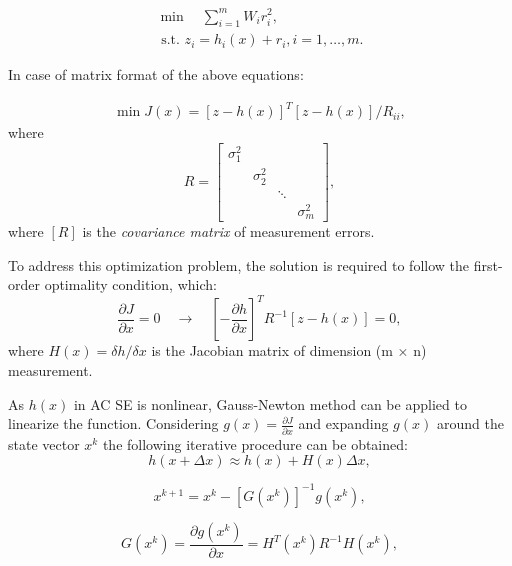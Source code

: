 \begin{equation}
    \begin{array}{c}
    \operatorname{min} \quad \sum_{i=1}^{m} W_{i} r_{i}^{2}, \\
    \text { s.t. } z_{i}=h_{i}(x)+r_{i}, i=1, \ldots, m.
\end{array}
\label{eq:min_rsd}
\end{equation}

In case of matrix format of the above equations:

\begin{equation}
    \begin{array}{l}
\min J(x)=[z-h(x)]^{T} [z-h(x)] / R_{ii},
\end{array}
\end{equation}
where
\begin{equation}
    R=\left[\begin{array}{llll}
\sigma_{1}^{2} & & & \\
& \sigma_{2}^{2} & & \\
& & \ddots & \\
& & & \sigma_{m}^{2}
\end{array}\right],
\label{eq:mlm_r}
\end{equation}
where $[R]$ is the \textit{covariance matrix} of measurement errors.

To address this optimization problem, the solution is required to follow the first-order optimality condition, which:
\begin{equation}
    \frac{\partial J}{\partial x}=0 \quad \rightarrow \quad\left[-\frac{\partial h}{\partial x}\right]^{T} R^{-1}[z-h(x)]=0,
    \label{eq:mlm_optcond}
\end{equation}
where \(H(x)=\delta h / \delta x\) is the Jacobian matrix of dimension (m × n) measurement.

As $h(x)$ in AC SE is nonlinear, Gauss-Newton method can be applied to linearize the function. Considering \(g(x)=\frac{\partial J}{\partial x}\) and expanding $g(x)$ around the state vector $x^k$ the following iterative procedure can be obtained:
\begin{equation}
    h(x+\Delta x) \approx h(x)+H(x) \Delta x,
\end{equation}

\begin{equation}
    x^{k+1}=x^{k}-\left[G\left(x^{k}\right)\right]^{-1} g\left(x^{k}\right),
\end{equation}

\begin{equation}
    G\left(x^{k}\right)=\frac{\partial g\left(x^{k}\right)}{\partial x}=H^{T}\left(x^{k}\right) R^{-1} H\left(x^{k}\right),
\end{equation}

